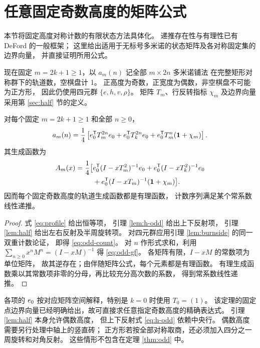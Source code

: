 \section{任意固定奇数高度的矩阵公式}\label{sec:odd}

本节将固定高度对称计数的有限状态方法具体化。
递推存在性与有理性已有 DeFord \cite[定理 6.1]{deford} 的一般框架；
这里给出适用于无标号多米诺的状态矩阵及各对称固定集的边界向量，
并直接证明所用公式。

现在固定 $m=2k+1\ge1$，以 $a_m(n)$ 记全部 $m\times2n$ 多米诺铺法
在完整矩形对称群下的轨道数，空棋盘计 1。
正高度为奇数，正宽度为偶数，非空棋盘不可能为正方形，
因此仍使用四元群 $\{e,h,v,\rho\}$。
矩阵 $T_m$、行反转指标 $\chi_m$ 及边界向量采用第 \ref{sec:half} 节的定义。

\begin{theorem}[奇数高度的轨道公式]\label{thm:odd}
对每个固定 $m=2k+1\ge1$ 和全部 $n\ge0$，
\begin{equation}\label{eq:odd-count}
 a_m(n)=\frac14\left[
 e_0^{\mathsf T}T_m^{2n}e_0
 +e_0^{\mathsf T}T_k^{2n}e_0
 +e_0^{\mathsf T}T_m^n(\boldsymbol{1}+\chi_m)\right].
\end{equation}
其生成函数为
\begin{equation}\label{eq:odd-gf}
\begin{split}
 A_m(x)=\frac14\bigl[&
 e_0^{\mathsf T}(I-xT_m^2)^{-1}e_0
 +e_0^{\mathsf T}(I-xT_k^2)^{-1}e_0\\
 &+e_0^{\mathsf T}(I-xT_m)^{-1}(\boldsymbol{1}+\chi_m)\bigr].
\end{split}
\end{equation}
因而每个固定奇数高度的轨道生成函数都是有理函数，
计数序列满足某个常系数线性递推。
\end{theorem}
\begin{proof}
式 \eqref{eq:profile} 给出恒等项，
引理 \ref{lem:h-odd} 给出上下反射项，
引理 \ref{lem:half} 给出左右反射及半周旋转项。
对四元群应用引理 \ref{lem:burnside} 的同一双重计数论证，
即得 \eqref{eq:odd-count}。
对 $n$ 作形式求和，利用
$\sum_{n\ge0}x^n M^n=(I-xM)^{-1}$ 得 \eqref{eq:odd-gf}。
各矩阵有限，$I-xM$ 的常数项为单位矩阵，
故其逆存在；由伴随矩阵公式，每个元素都是有理函数。
有理生成函数乘以其常数项非零的分母，再比较充分高次数的系数，
得到常系数线性递推。
\end{proof}

各项的 $e_0$ 按对应矩阵空间解释，特别是 $k=0$ 时使用 $T_0=(1)$。
该定理的固定点边界向量已经明确给出，故可直接求任意指定奇数高度的精确表达式。
引理 \ref{lem:half} 本身允许偶数高度，
但上下反射式 \eqref{eq:h-odd} 依赖中央行。
偶数高度需要另行处理中轴上的竖直砖；
正方形若按全部对称取商，还必须加入四分之一周旋转和对角反射。
这些情形不包含在定理 \ref{thm:odd} 中。
